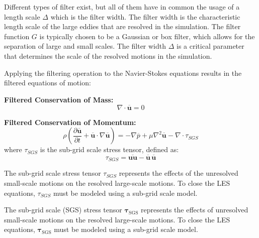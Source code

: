 Different types of filter exist, but all of them have in common the
usage of a length scale $\Delta$ which is the filter width. The filter width
is the characteristic length scale of the large eddies that are resolved in the simulation.
The filter function $G$ is typically chosen to be a Gaussian or box filter,
which allows for the separation of large and small scales. The filter width $\Delta$ is a critical parameter that determines the scale of the resolved motions in the simulation.

Applying the filtering operation to the Navier-Stokes equations results in the filtered equations of motion:

\textbf{Filtered Conservation of Mass:}
\begin{equation}
\nabla \cdot \overline{\mathbf{u}} = 0
\end{equation}

\textbf{Filtered Conservation of Momentum:}
\begin{equation}
\rho \left( \frac{\partial \overline{\mathbf{u}}}{\partial t} + \overline{\mathbf{u}} \cdot \nabla \overline{\mathbf{u}} \right) = -\nabla \overline{p} + \mu \nabla^2 \overline{\mathbf{u}} - \nabla \cdot \tau_{SGS}
\end{equation}
where $\tau_{SGS}$ is the sub-grid scale stress tensor, defined as:
\begin{subequations}
    \begin{equation}
    \tau_{SGS} = \overline{\mathbf{u} \mathbf{u}} - \overline{\mathbf{u}} \, \overline{\mathbf{u}}
    \end{equation}
\end{subequations}
    

The sub-grid scale stress tensor $\tau_{SGS}$ represents the effects of the unresolved small-scale motions on the resolved large-scale motions. To close the LES equations, $\tau_{SGS}$ must be modeled using a sub-grid scale model.

The sub-grid scale (SGS) stress tensor $\boldsymbol{\tau}_{\mathrm{SGS}}$ represents the effects of unresolved small-scale motions on the resolved large-scale motions. To close the LES equations, $\boldsymbol{\tau}_{\mathrm{SGS}}$ must be modeled using a sub-grid scale model.

